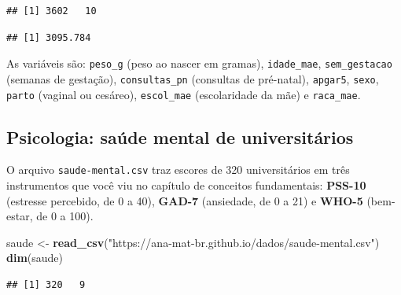 \documentclass[
]{book}
\newenvironment{Shaded}{\begin{snugshade}}{\end{snugshade}}
\newcommand{\CommentTok}[1]{\textcolor[rgb]{0.56,0.35,0.01}{\textit{#1}}}
\newcommand{\FunctionTok}[1]{\textcolor[rgb]{0.13,0.29,0.53}{\textbf{#1}}}
\newcommand{\NormalTok}[1]{#1}
\newcommand{\OtherTok}[1]{\textcolor[rgb]{0.56,0.35,0.01}{#1}}
\newcommand{\SpecialCharTok}[1]{\textcolor[rgb]{0.81,0.36,0.00}{\textbf{#1}}}
\newcommand{\StringTok}[1]{\textcolor[rgb]{0.31,0.60,0.02}{#1}}
\begin{document}
\begin{verbatim}
## [1] 3602   10
\end{verbatim}

\begin{Shaded}
\end{Shaded}

\begin{verbatim}
## [1] 3095.784
\end{verbatim}

As variáveis são: \texttt{peso\_g} (peso ao nascer em gramas), \texttt{idade\_mae}, \texttt{sem\_gestacao} (semanas de gestação), \texttt{consultas\_pn} (consultas de pré-natal), \texttt{apgar5}, \texttt{sexo}, \texttt{parto} (vaginal ou cesáreo), \texttt{escol\_mae} (escolaridade da mãe) e \texttt{raca\_mae}.

\subsection{Psicologia: saúde mental de universitários}\label{psicologia-sauxfade-mental-de-universituxe1rios}

O arquivo \texttt{saude-mental.csv} traz escores de 320 universitários em três instrumentos que você viu no capítulo de conceitos fundamentais: \textbf{PSS-10} (estresse percebido, de 0 a 40), \textbf{GAD-7} (ansiedade, de 0 a 21) e \textbf{WHO-5} (bem-estar, de 0 a 100).

\begin{Shaded}
\begin{Highlighting}[]
\NormalTok{saude }\OtherTok{\textless{}{-}} \FunctionTok{read\_csv}\NormalTok{(}\StringTok{"https://ana{-}mat{-}br.github.io/dados/saude{-}mental.csv"}\NormalTok{)}
\FunctionTok{dim}\NormalTok{(saude)}
\end{Highlighting}
\end{Shaded}

\begin{verbatim}
## [1] 320   9
\end{verbatim}

\begin{Shaded}
\end{Shaded}
\end{document}
